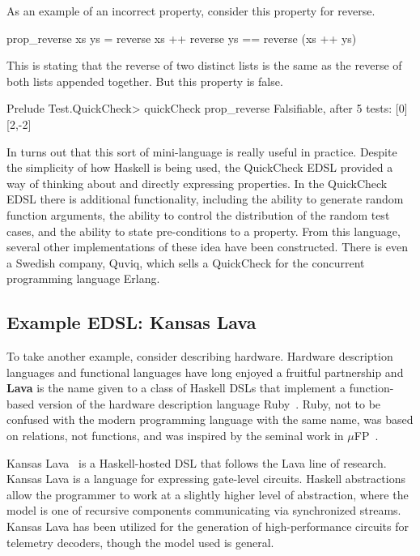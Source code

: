 \documentclass[11pt]{article}
\begin{document}
As an example of an incorrect property, consider this property for reverse.
\begin{Code}
prop_reverse xs ys = reverse xs ++ reverse ys == reverse (xs ++ ys)
\end{Code}
This is stating that the reverse of two distinct lists
is the same as the reverse of both lists appended together.
But this property is false.
\begin{Code}
Prelude Test.QuickCheck> quickCheck prop_reverse 
Falsifiable, after 5 tests:
[0]
[2,-2]
\end{Code}

In turns out that this sort of mini-language is really useful in practice.
Despite the simplicity of how Haskell is being used, the QuickCheck EDSL
provided a way of thinking about and directly expressing properties.
In the QuickCheck EDSL there is additional functionality, including
the ability to generate random function arguments, the ability to control
the distribution of the random test cases, and the ability to state pre-conditions
to a property. From this language, several other implementations of
these idea have been constructed. There is even a Swedish company, Quviq,
which sells a QuickCheck for the concurrent programming language Erlang.

\subsection{Example EDSL: Kansas Lava}\label{sec:KansasLava}

To take another example, consider describing hardware.
Hardware description languages and functional languages have
long enjoyed a fruitful partnership and
{\bf Lava} is the name given to a class of Haskell DSLs
that implement a function-based version of the hardware description
language Ruby~\cite{Jones:90:Ruby,Hutton:93:RubyInterp}. Ruby, not to be confused with the
modern programming language with the same name, was based
on relations, not functions, and was inspired by
the seminal work in $\mu$FP~\cite{Sheeran:84:muFP}.

Kansas Lava~\cite{Gill:13:TypesKansasLava} is a Haskell-hosted DSL
that follows the Lava line of research.
Kansas Lava is a language for expressing gate-level circuits.
Haskell abstractions allow the programmer to work at
a slightly higher level of abstraction, where the model
is one of recursive components communicating via synchronized streams.
Kansas Lava has been utilized for the generation of high-performance circuits for telemetry decoders,
though the model used is general.
\end{document}
